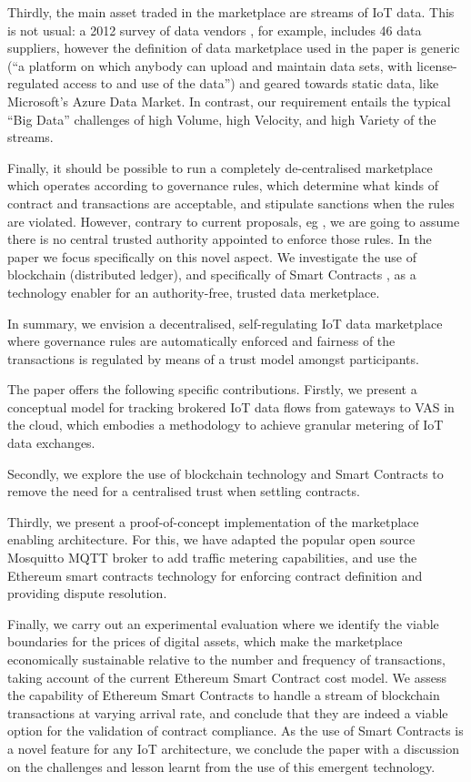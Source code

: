 \documentclass[chi_draft]{sigchi}
\begin{document}
Thirdly, the main asset traded in the marketplace are streams of IoT data. This is not usual: a 2012 survey of data vendors \cite{Schomm2013}, for example, includes 46 data suppliers, however the definition of data marketplace used in the paper is generic (``a platform on which anybody can upload and maintain data sets, with license-regulated access to and use of the data'') and geared towards static data, like Microsoft's Azure Data Market.
In contrast, our requirement entails the typical ``Big Data'' challenges of high Volume, high Velocity, and high Variety of the streams.

Finally, it should be possible to run a completely de-centralised marketplace which operates according to governance rules, which determine what kinds of contract and transactions are acceptable, and stipulate sanctions when the rules are violated. 
However, contrary to current proposals, eg \cite{Cao:2016:MMR:2926746.2883611}, we are going to assume  there is no central trusted authority appointed to enforce those rules.
In the paper we focus specifically on this novel aspect. We investigate the use of blockchain (distributed ledger), and specifically of Smart Contracts \cite{Buterin2014}, as a technology enabler for an authority-free, trusted data merketplace.

In summary, we envision a decentralised, self-regulating IoT data marketplace where governance rules are automatically enforced and fairness of the transactions is regulated by means of a trust model amongst participants.

The paper offers the following specific contributions.
%
Firstly,  we present a conceptual model for tracking brokered IoT data flows from gateways to VAS in the cloud, which embodies a methodology to achieve granular metering of IoT data exchanges.

Secondly, we explore the use of blockchain technology and Smart Contracts to remove the need for a centralised trust when settling contracts. 

Thirdly, we present a proof-of-concept implementation of the marketplace enabling architecture. For this, we have adapted the popular open source Mosquitto MQTT broker to add traffic metering capabilities, and use the Ethereum smart contracts technology for enforcing contract definition and providing dispute resolution.

Finally, we carry out an experimental evaluation where we identify the viable boundaries for the prices of digital assets, which make the marketplace economically sustainable relative to the number and frequency of transactions, taking account of the current Ethereum Smart Contract cost model.
We assess the capability of Ethereum Smart Contracts to handle a stream of blockchain transactions at varying arrival rate, and conclude that they are indeed a viable option for the validation of contract compliance.
As the use of Smart Contracts is a novel feature for any IoT architecture, we conclude the paper with a discussion on the challenges and lesson learnt from the use of this emergent technology.
\end{document}
